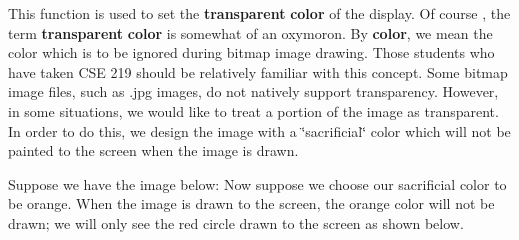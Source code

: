 This function is used to set the {\bfseries transparent} {\bfseries color} of the display. Of course , the term {\bfseries transparent} {\bfseries color} is somewhat of an oxymoron. By  {\bfseries color}, we mean the color which is to be ignored during bitmap image drawing. Those students who have taken C\-S\-E 219 should be relatively familiar with this concept. Some bitmap image files, such as .jpg images, do not natively support transparency. However, in some situations, we would like to treat a portion of the image as transparent. In order to do this, we design the image with a \char`\"{}sacrificial\char`\"{} color which will not be painted to the screen when the image is drawn.

Suppose we have the image below\-:  Now suppose we choose our sacrificial color to be orange. When the image is drawn to the screen, the orange color will not be drawn; we will only see the red circle drawn to the screen as shown below.

